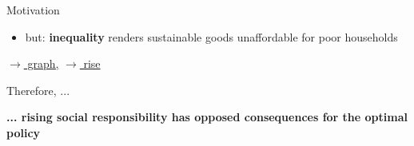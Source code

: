 \documentclass[11pt,aspectratio=169]{beamer}
\begin{document}
\begin{frame}{Motivation}
\begin{itemize}[<+-| alert@+>]
			\item<+-| alert@+>  but: \textcolor{myorange}{\textbf{inequality}} renders sustainable goods unaffordable for poor households
		\end{itemize}
		
		\vspace{5mm}
		\hfill	\hyperlink{indis}{\tiny{$\rightarrow$ graph,}}
		\hyperlink{rise2}{\tiny{$\rightarrow$ rise}}
	\end{frame}
	
	
	
	\begin{frame}{Therefore, ...}

		\vspace{-3mm}
		\textbf{\textcolor{myorange}{... rising social responsibility has opposed consequences for the optimal policy}}
		\pause
		\vspace{2mm}
		\begin{itemize}	 %
			

\end{itemize}
\end{frame}
\end{document}
